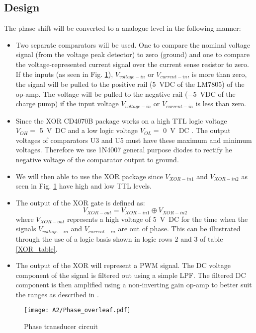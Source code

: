 \subsection{Design} \label{sec:phase_design}

The phase shift will be converted to a analogue level in the following manner:
\begin{itemize}
    \item Two separate comparators will be used.
    One to compare the nominal voltage signal (from the voltage peak detector) to zero (ground) and one to compare the voltage-represented current signal over the current sense resistor to zero. If the inputs (as seen in Fig. \ref{fig:phase_diag}), $V_{voltage-in}$ or $V_{current-in}$, is more than zero, the signal will be pulled to the positive rail (\SI{+5}{VDC} of the LM7805) of the op-amp. The voltage will be pulled to the negative rail (\SI{-5}{VDC} of the charge pump) if the input voltage $V_{voltage-in}$ or $V_{current-in}$ is less than zero.
    \item Since the XOR CD4070B package works on a high TTL logic voltage \\$V_{OH}=$ \SI{5}{\volt DC} and a low logic voltage $V_{OL}=$ \SI{0}{\volt DC} \cite{CD4070b}. The output voltages of comparators U3 and U5 must have these maximum and minimum voltages. Therefore we use 1N4007 general purpose diodes to rectify he negative voltage of the comparator output to ground.
    \item We will then able to use the XOR package since $V_{XOR-in1}$ and $V_{XOR-in2}$ as seen in Fig. \ref{fig:phase_diag} have high and low TTL levels.
    \item The output of the XOR gate is defined as:$$V_{XOR-out}=V_{XOR-in1} \oplus V_{XOR-in2}$$ where $V_{XOR-out}$ represents a high voltage of \SI{5}{\volt DC} for the time when the signals $V_{voltage-in}$ and $V_{current-in}$ are out of phase. This can be illustrated through the use of a logic basis shown in logic rows 2 and 3 of table \ref{XOR_table}. 
    \item The output of the XOR will represent a PWM signal. The DC voltage component of the signal is filtered out using a simple LPF. The filtered DC component is then amplified using a non-inverting gain op-amp to better suit the ranges as described in \cite{assignment_2}.
\end{itemize}



\begin{figure}[H]
    \centering
    \texttt{[image: A2/Phase\_overleaf.pdf]}
    \caption{Phase transducer circuit}
    \label{fig:phase_diag}
\end{figure}

